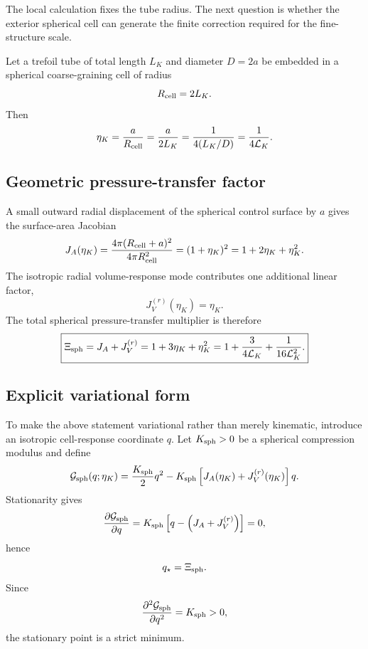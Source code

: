 \documentclass[11pt]{article}
\newcommand{\LK}{\mathcal L_K}
\newcommand{\Xisph}{\Xi_{\rm sph}}
\begin{document}
The local calculation fixes the tube radius.  The next question is whether the exterior
spherical cell can generate the finite correction required for the fine-structure scale.

Let a trefoil tube of total length \(L_K\) and diameter \(D=2a\) be embedded in a spherical
coarse-graining cell of radius
\begin{equation}
  R_{\rm cell}=2L_K.
  \label{eq:Rcell}
\end{equation}
Then
\begin{equation}
  \eta_K
  =
  \frac{a}{R_{\rm cell}}
  =
  \frac{a}{2L_K}
  =
  \frac{1}{4(L_K/D)}
  =
  \frac{1}{4\LK}.
  \label{eq:eta}
\end{equation}

\subsection{Geometric pressure-transfer factor}

A small outward radial displacement of the spherical control surface by \(a\) gives the
surface-area Jacobian
\begin{equation}
  J_A(\eta_K)
  =
  \frac{4\pi(R_{\rm cell}+a)^2}{4\pi R_{\rm cell}^2}
  =
  (1+\eta_K)^2
  =
  1+2\eta_K+\eta_K^2.
  \label{eq:JA}
\end{equation}
The isotropic radial volume-response mode contributes one additional linear factor,
\begin{equation}
  J_V^{(r)}(\eta_K)=\eta_K.
  \label{eq:JV}
\end{equation}
The total spherical pressure-transfer multiplier is therefore
\begin{equation}
  \boxed{
  \Xisph
  =
  J_A+J_V^{(r)}
  =
  1+3\eta_K+\eta_K^2
  =
  1+\frac{3}{4\LK}+\frac{1}{16\LK^2}.
  }
  \label{eq:Xi}
\end{equation}

\subsection{Explicit variational form}

To make the above statement variational rather than merely kinematic, introduce an isotropic
cell-response coordinate \(q\).  Let \(K_{\rm sph}>0\) be a spherical compression modulus and
define
\begin{equation}
  \mathcal G_{\rm sph}(q;\eta_K)
  =
  \frac{K_{\rm sph}}{2}q^2
  -
  K_{\rm sph}\left[J_A(\eta_K)+J_V^{(r)}(\eta_K)\right]q.
  \label{eq:G-sph}
\end{equation}
Stationarity gives
\begin{equation}
  \frac{\partial\mathcal G_{\rm sph}}{\partial q}
  =
  K_{\rm sph}
  \left[
  q-\left(J_A+J_V^{(r)}\right)
  \right]
  =
  0,
\end{equation}
hence
\begin{equation}
  q_\star=\Xisph.
\end{equation}
Since
\begin{equation}
  \frac{\partial^2\mathcal G_{\rm sph}}{\partial q^2}=K_{\rm sph}>0,
\end{equation}
the stationary point is a strict minimum.
\end{document}
